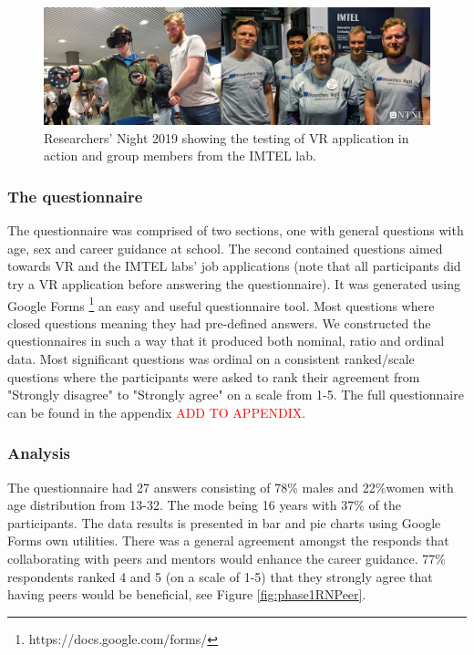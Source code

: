\begin{figure}[!ht]
    \centering
    \captionsetup{width=.8\linewidth}
    \includegraphics[width=.9\textwidth]{./fig/phase_1/researcherNight/RN_group.jpg}
    \caption{Researchers' Night 2019 showing the testing of VR application in action and group members from the IMTEL lab.}
    \label{fig:phase1RNGroup}
\end{figure}


\subsubsection{The questionnaire}
The questionnaire was comprised of two sections, one with general questions with age, sex and career guidance at school. The second contained questions aimed towards VR and the IMTEL labs' job applications (note that all participants did try a VR application before answering the questionnaire). It was generated using Google Forms \footnote{https://docs.google.com/forms/} an easy and useful questionnaire tool. Most questions where closed questions meaning they had pre-defined answers. We constructed the questionnaires in such a way that it produced both nominal, ratio and ordinal data. Most significant questions was ordinal on a consistent ranked/scale questions where the participants were asked to rank their agreement from  "Strongly disagree" to "Strongly agree" on a scale from 1-5. 
The full questionnaire can be found in the appendix \textcolor{red}{ADD TO APPENDIX}. 

\subsubsection{Analysis}
The questionnaire had 27 answers consisting of 78\% males and 22\%women with age distribution from 13-32. The mode being 16 years with 37\% of the participants. The data results is presented in bar and pie charts using Google Forms own utilities. There was a general agreement amongst the responds that collaborating with peers and mentors would enhance the career guidance. 77\% respondents ranked 4 and 5 (on a scale of 1-5) that they strongly agree that having peers would be beneficial, see Figure \ref{fig:phase1RNPeer}.    

